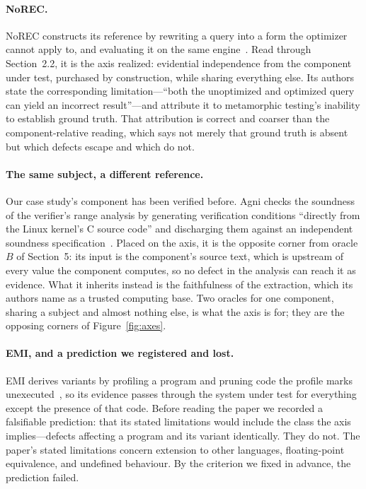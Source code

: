 \paragraph{NoREC.}
NoREC constructs its reference by rewriting a query into a form the optimizer cannot
apply to, and evaluating it on the same engine~\cite{rigger2020norec}. Read through
Section~2.2, it is the axis realized: evidential independence from the component under
test, purchased by construction, while sharing everything else. Its authors state the
corresponding limitation---``both the unoptimized and optimized query can yield an
incorrect result''---and attribute it to metamorphic testing's inability to establish
ground truth. That attribution is correct and coarser than the component-relative
reading, which says not merely that ground truth is absent but which defects escape
and which do not.

\paragraph{The same subject, a different reference.}
Our case study's component has been verified before. Agni checks the soundness of the
verifier's range analysis by generating verification conditions ``directly from the
Linux kernel's C source code'' and discharging them against an independent soundness
specification~\cite{vishwanathan2023agni}. Placed on the axis, it is the opposite
corner from oracle $B$ of Section~5: its input is the component's source text, which
is upstream of every value the component computes, so no defect in the analysis can
reach it as evidence. What it inherits instead is the faithfulness of the extraction,
which its authors name as a trusted computing base. Two oracles for one component,
sharing a subject and almost nothing else, is what the axis is for; they are the
opposing corners of Figure~\ref{fig:axes}.

\paragraph{EMI, and a prediction we registered and lost.}
EMI derives variants by profiling a program and pruning code the profile marks
unexecuted~\cite{le2014emi}, so its evidence passes through the system under test for
everything except the presence of that code. Before reading the paper we recorded a
falsifiable prediction: that its stated limitations would include the class the axis
implies---defects affecting a program and its variant identically. They do not. The
paper's stated limitations concern extension to other languages, floating-point
equivalence, and undefined behaviour. By the criterion we fixed in advance, the
prediction failed.

